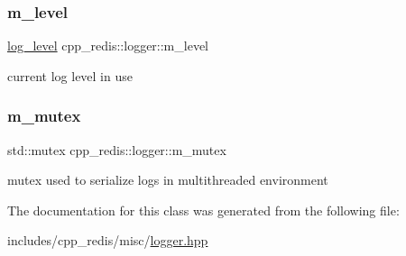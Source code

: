\subsubsection{\texorpdfstring{m\+\_\+level}{m\_level}}
{\footnotesize\ttfamily \hyperlink{classcpp__redis_1_1logger_a9493594d547e7abe71b8690be1946c7a}{log\+\_\+level} cpp\+\_\+redis\+::logger\+::m\+\_\+level\hspace{0.3cm}{\ttfamily [private]}}

current log level in use \mbox{\label{classcpp__redis_1_1logger_a74810c30886b21bde6590c0d21234c05}} 
\subsubsection{\texorpdfstring{m\+\_\+mutex}{m\_mutex}}
{\footnotesize\ttfamily std\+::mutex cpp\+\_\+redis\+::logger\+::m\+\_\+mutex\hspace{0.3cm}{\ttfamily [private]}}

mutex used to serialize logs in multithreaded environment 

The documentation for this class was generated from the following file\+:\begin{DoxyCompactItemize}
\item 
includes/cpp\+\_\+redis/misc/\hyperlink{logger_8hpp}{logger.\+hpp}\end{DoxyCompactItemize}

